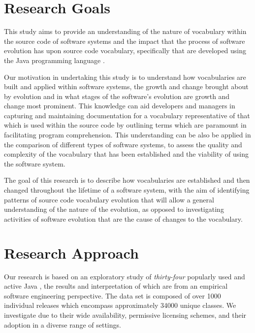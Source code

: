 \section{Research Goals} %
\label{sec:research_goals}

This study aims to provide an understanding of the nature of vocabulary within the source code of software systems and the impact that the process of software evolution has upon source code vocabulary, specifically {\OSYS} that are developed using the Java programming language \cite{Gosling00a}.

Our motivation in undertaking this study is to understand how vocabularies are built and applied within software systems, the growth and change brought about by evolution and in what stages of the software's evolution are growth and change most prominent. This knowledge can aid developers and managers in capturing and maintaining documentation for a vocabulary representative of that which is used within the source code by outlining terms which are paramount in facilitating program comprehension. This understanding can be also be applied in the comparison of different types of software systems, to assess the quality and complexity of the vocabulary that has been established and the viability of using the software system.

The goal of this research is to describe how vocabularies are established and then changed throughout the lifetime of a software system, with the aim of identifying patterns of source code vocabulary evolution that will allow a general understanding of the nature of the evolution, as opposed to investigating activities of software evolution that are the cause of changes to the vocabulary.


\section{Research Approach} %
\label{sec:research_approach}

Our research is based on an exploratory study of \emph{thirty-four} popularly used and active Java {\OSYS}, the results and interpretation of which are from an empirical software engineering perspective. The data set is composed of over 1000 individual releases which encompass approximately 34000 unique classes. We investigate {\OSYS} due to their wide availability, permissive licensing schemes, and their adoption in a diverse range of settings.

